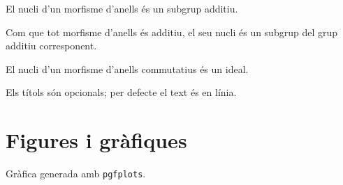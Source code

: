 \documentclass[a4paper]{article}
\begin{document}
\begin{lema}
El nucli d'un morfisme d'anells és un subgrup additiu.
\end{lema}
\begin{demostracio}
Com que tot morfisme d'anells és additiu, el seu nucli
és un subgrup del grup additiu corresponent.
\end{demostracio}

\begin{cor}[Conseqüència]
El nucli d'un morfisme d'anells commutatius és un ideal.
\end{cor}

\begin{comentari}
Els títols són opcionals; per defecte el text és en línia.
\end{comentari}

\section{Figures i gràfiques}
\begin{grafica}[xmin=-2.2,xmax=2.2,ymin=-1.5,ymax=3.4]
\end{grafica}
\begin{center}\footnotesize Gràfica generada amb \texttt{pgfplots}.\end{center}
\end{document}
